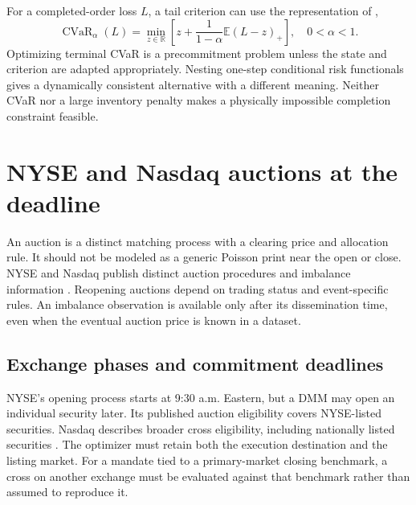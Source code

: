 \documentclass[11pt]{article}
\numberwithin{equation}{section}
\theoremstyle{definition}
\theoremstyle{remark}
\newcommand{\R}{\mathbb{R}}
\newcommand{\E}{\mathbb{E}}
\theoremstyle{definition}
\newcommand{\CVaR}{\operatorname{CVaR}}
\begin{document}
For a completed-order loss $L$, a tail criterion can use the representation
of \citet{rockafellar2000},
\begin{equation}\label{eq:cvar}
 \CVaR_\alpha(L)=\min_{z\in\R}
       \left[z+\frac{1}{1-\alpha}\E(L-z)_+\right],\quad 0<\alpha<1.
\end{equation}
Optimizing terminal CVaR is a precommitment problem unless the state and
criterion are adapted appropriately. Nesting one-step conditional risk
functionals gives a dynamically consistent alternative with a different
meaning. Neither CVaR nor a large inventory penalty makes a physically
impossible completion constraint feasible.

\section{NYSE and Nasdaq auctions at the deadline}\label{sec:auctions}

An auction is a distinct matching process with a clearing price and allocation
rule. It should not be modeled as a generic Poisson print near the open or
close. NYSE and Nasdaq publish distinct auction procedures and imbalance
information \citep{nyseauctions,nasdaqcross}. Reopening auctions depend on trading status and
event-specific rules. An imbalance observation is available only after its
dissemination time, even when the eventual auction price is known in a dataset.

\subsection{Exchange phases and commitment deadlines}

NYSE's opening process starts at 9:30 a.m. Eastern, but a DMM may open an
individual security later. Its published auction eligibility covers NYSE-listed
securities. Nasdaq describes broader cross eligibility, including nationally
listed securities \citep{nyseauctions,nasdaqcross}. The optimizer must retain
both the execution destination and the listing market. For a mandate tied to a
primary-market closing benchmark, a cross on another exchange must be evaluated
against that benchmark rather than assumed to reproduce it.
\end{document}
